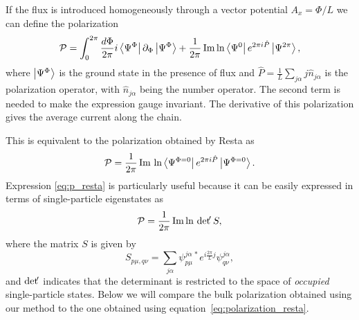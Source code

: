 \documentclass[twocolumn,amsmath,longbibliography,amssymb,superscriptaddress]{revtex4-1}
\begin{document}
If the flux is introduced homogeneously through a vector potential $A_x = \Phi/L$ we can define the polarization
\begin{equation}\label{polarization_inhom}
\mathcal{P} = \int_0^{2\pi}\frac{d\Phi}{2\pi} i\bra{\Psi^\Phi}\partial_\Phi \ket{\Psi^\Phi} + \frac{1}{2\pi}\Im\ln \bra{\Psi^0}e^{2\pi i \hat{P}} \ket{\Psi^{2\pi}}, 
\end{equation}
where $\ket{\Psi^{\Phi}}$ is the ground state in the presence of flux and $\hat{P}=\frac{1}{L}\sum_{j\alpha} j\hat{n}_{j\alpha}$ is the polarization operator, with $\hat{n}_{j\alpha}$ being the number operator. The second term is needed to make the expression gauge invariant. The derivative of this polarization gives the average current along the chain.

This is equivalent to the polarization obtained by Resta \cite{Resta1997} as
\begin{align}
\mathcal{P} = \frac{1}{2\pi} \Im \,\ln\bra{\Psi^{\Phi=0}}e^{2\pi i \hat{P}}\ket{\Psi^{\Phi=0}}.
\label{eq:p_resta}
\end{align}
Expression \eqref{eq:p_resta} is particularly useful because it can be easily expressed in terms of single-particle eigenstates as
\begin{align}
\mathcal{P} = \frac{1}{2\pi}\Im \ln \, {\rm det }\!' \, S,
\label{eq:polarization_resta}
\end{align}
where the matrix $S$ is given by
\begin{equation}
S_{p\mu,q\nu} = \sum_{j\alpha} \psi_{p\mu}^{j \alpha \, \ast} e^{i\frac{2\pi}{L}j}\psi_{q\nu}^{j \alpha},
\end{equation}
and  ${\rm det }\!' $ indicates that the determinant is restricted to the space of \emph{occupied} single-particle states. Below we will compare the bulk polarization obtained using our method to the one obtained using equation~\eqref{eq:polarization_resta}.
\end{document}
